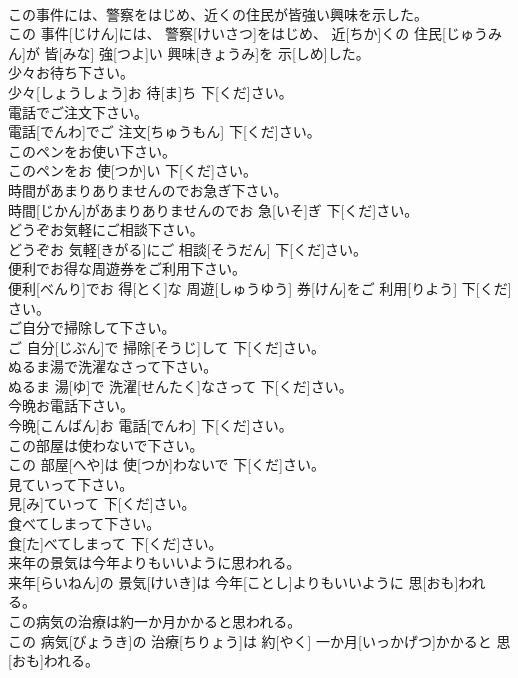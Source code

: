 \documentclass[8pt]{extreport}
\begin{document}
\begin{CJK}{UTF8}{min}
\\	この事件には、警察をはじめ、近くの住民が皆強い興味を示した。	
\\	この 事件[じけん]には、 警察[けいさつ]をはじめ、 近[ちか]くの 住民[じゅうみん]が 皆[みな] 強[つよ]い 興味[きょうみ]を 示[しめ]した。
\\	少々お待ち下さい。	
\\	少々[しょうしょう]お 待[ま]ち 下[くだ]さい。
\\	電話でご注文下さい。	
\\	電話[でんわ]でご 注文[ちゅうもん] 下[くだ]さい。
\\	このペンをお使い下さい。	
\\	このペンをお 使[つか]い 下[くだ]さい。
\\	時間があまりありませんのでお急ぎ下さい。	
\\	時間[じかん]があまりありませんのでお 急[いそ]ぎ 下[くだ]さい。
\\	どうぞお気軽にご相談下さい。	
\\	どうぞお 気軽[きがる]にご 相談[そうだん] 下[くだ]さい。
\\	便利でお得な周遊券をご利用下さい。	
\\	便利[べんり]でお 得[とく]な 周遊[しゅうゆう] 券[けん]をご 利用[りよう] 下[くだ]さい。
\\	ご自分で掃除して下さい。	
\\	ご 自分[じぶん]で 掃除[そうじ]して 下[くだ]さい。
\\	ぬるま湯で洗濯なさって下さい。	
\\	ぬるま 湯[ゆ]で 洗濯[せんたく]なさって 下[くだ]さい。
\\	今晩お電話下さい。	
\\	今晩[こんばん]お 電話[でんわ] 下[くだ]さい。
\\	この部屋は使わないで下さい。	
\\	この 部屋[へや]は 使[つか]わないで 下[くだ]さい。
\\	見ていって下さい。	
\\	見[み]ていって 下[くだ]さい。
\\	食べてしまって下さい。	
\\	食[た]べてしまって 下[くだ]さい。
\\	来年の景気は今年よりもいいように思われる。	
\\	来年[らいねん]の 景気[けいき]は 今年[ことし]よりもいいように 思[おも]われる。
\\	この病気の治療は約一か月かかると思われる。	
\\	この 病気[びょうき]の 治療[ちりょう]は 約[やく] 一か月[いっかげつ]かかると 思[おも]われる。

\end{CJK}
\end{document}
